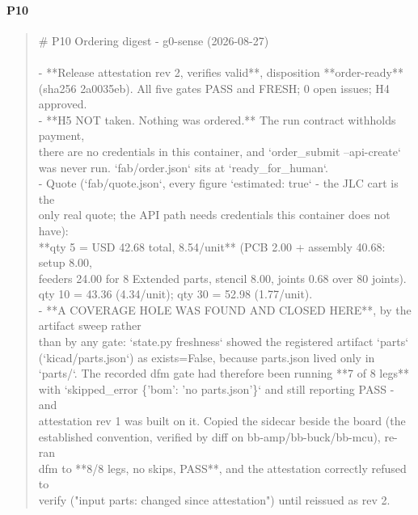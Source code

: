 \documentclass[11pt,a4paper]{article}
\begin{document}
\paragraph*{P10}
\begin{quote}\small\ttfamily\raggedright
\# P10 Ordering digest - g0-sense (2026-08-27)\\
~\\
- {*}{*}Release attestation rev 2, verifies valid{*}{*}, disposition {*}{*}order-ready{*}{*}\\
  (sha256 2a0035eb). All five gates PASS and FRESH; 0 open issues; H4 approved.\\
- {*}{*}H5 NOT taken. Nothing was ordered.{*}{*} The run contract withholds payment,\\
  there are no credentials in this container, and `order\_submit --api-create`\\
  was never run. `fab/order.json` sits at `ready\_for\_human`.\\
- Quote (`fab/quote.json`, every figure `estimated: true` - the JLC cart is the\\
  only real quote; the API path needs credentials this container does not have):\\
  {*}{*}qty 5 = USD 42.68 total, 8.54/unit{*}{*} (PCB 2.00 + assembly 40.68: setup 8.00,\\
  feeders 24.00 for 8 Extended parts, stencil 8.00, joints 0.68 over 80 joints).\\
  qty 10 = 43.36 (4.34/unit); qty 30 = 52.98 (1.77/unit).\\
- {*}{*}A COVERAGE HOLE WAS FOUND AND CLOSED HERE{*}{*}, by the artifact sweep rather\\
  than by any gate: `state.py freshness` showed the registered artifact `parts`\\
  (`kicad/parts.json`) as exists=False, because parts.json lived only in\\
  `parts/`. The recorded dfm gate had therefore been running {*}{*}7 of 8 legs{*}{*}\\
  with `skipped\_error \{'bom': 'no parts.json'\}` and still reporting PASS - and\\
  attestation rev 1 was built on it. Copied the sidecar beside the board (the\\
  established convention, verified by diff on bb-amp/bb-buck/bb-mcu), re-ran\\
  dfm to {*}{*}8/8 legs, no skips, PASS{*}{*}, and the attestation correctly refused to\\
  verify ("input parts: changed since attestation") until reissued as rev 2.\\

\end{quote}
\end{document}
